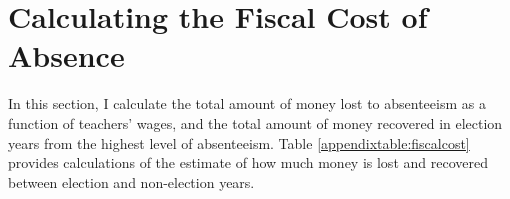 \documentclass[hidelinks, 12pt, article, oneside]{memoir}
\begin{document}
\SingleSpacing

\DoubleSpacing

\SingleSpacing

\DoubleSpacing

\clearpage

\section{Calculating the Fiscal Cost of Absence}\label{appendixsection:fiscalcost}

In this section, I calculate the total amount of money lost to absenteeism as a function of teachers' wages, and the total amount of money recovered in election years from the highest level of absenteeism.  Table \ref{appendixtable:fiscalcost} provides calculations of the estimate of how much money is lost and recovered between election and non-election years.
\end{document}
